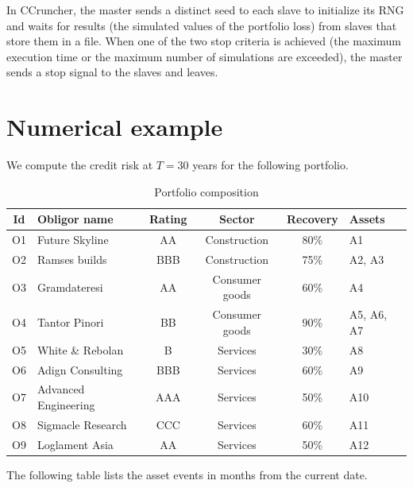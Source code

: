 \documentclass[a4paper,12pt,final]{article}
\begin{document}
In CCruncher, the master sends a distinct seed to each slave to initialize its RNG 
and waits for results (the simulated values of the portfolio loss) from slaves that 
store them in a file. When one of the two stop criteria is achieved (the maximum 
execution time or the maximum number of simulations are exceeded), the master sends 
a stop signal to the slaves and leaves.


\pagebreak
\section{Numerical example}

We compute the credit risk at $T=30$ years for the following portfolio.

\begin{table}[!h]
\begin{center}
\begin{tabular}[]{c|l|c|c|c|l}
Id  & Obligor name         & Rating & Sector         & Recovery & Assets     \\
\hline
O1  & Future Skyline       & AA     & Construction   & 80\%     & A1         \\
O2  & Ramses builds        & BBB    & Construction   & 75\%     & A2, A3     \\
O3  & Gramdateresi         & AA     & Consumer goods & 60\%     & A4         \\
O4  & Tantor Pinori        & BB     & Consumer goods & 90\%     & A5, A6, A7 \\
O5  & White \& Rebolan     & B      & Services       & 30\%     & A8         \\
O6  & Adign Consulting     & BBB    & Services       & 60\%     & A9         \\
O7  & Advanced Engineering & AAA    & Services       & 50\%     & A10        \\
O8  & Sigmacle Research    & CCC    & Services       & 60\%     & A11        \\
O9  & Loglament Asia       & AA     & Services       & 50\%     & A12        \\
\end{tabular}
\caption{Portfolio composition}
\label{example.portfolio}
\end{center}
\end{table}

The following table lists the asset events in months from the current date.
\end{document}
